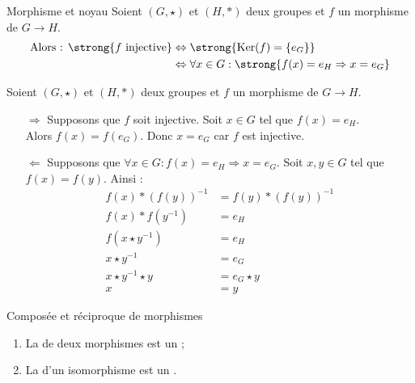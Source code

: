 \documentclass[12pt,a4paper]{report}
\begin{document}
    \begin{proposition}{Morphisme et noyau}{}
    Soient $(G, \star)$ et $(H, \ast)$ deux groupes et $f$ un morphisme de $G \rightarrow H$.
    \begin{align*}
        \text{Alors : } \strong{f \text{ injective}} &\Leftrightarrow \strong{\text{Ker}(f) = \{ e_G \}} \\
        &\Leftrightarrow \forall x \in G : \strong{f(x) = e_H \Rightarrow x = e_G}
    \end{align*}
    \end{proposition}
    
    \begin{demo}
    Soient $(G, \star)$ et $(H, \ast)$ deux groupes et $f$ un morphisme de $G \rightarrow H$.
    \begin{itemize}
        \item[$\Rightarrow$] Supposons que $f$ soit injective. Soit $x \in G$ tel que $f(x) = e_H$.\\
        Alors $f(x) = f(e_G)$. Donc $x = e_G$ car $f$ est injective.
        \item[$\Leftarrow$] Supposons que $\forall x \in G : f(x) = e_H \Rightarrow x = e_G$. Soit $x, y \in G$ tel que $f(x) = f(y)$. Ainsi :
        \begin{align*}
            f(x) \ast (f(y))^{-1} &= f(y) \ast (f(y))^{-1} \\
            f(x) \ast f\left(y^{-1}\right) &= e_H \\
            f\left(x \star y^{-1}\right) &= e_H \\
            x \star y^{-1} &= e_G \\
            x \star y^{-1} \star y &= e_G \star y \\
            x &= y 
        \end{align*}
    \end{itemize}
    \end{demo}
    
    \begin{proposition}{Composée et réciproque de morphismes}{}
    \begin{enumerate}[label=\bfseries\arabic*)]
        \item La  de deux morphismes est un  ;
        \item La  d'un isomorphisme est un .
    \end{enumerate}
    \end{proposition}
    
\end{document}
